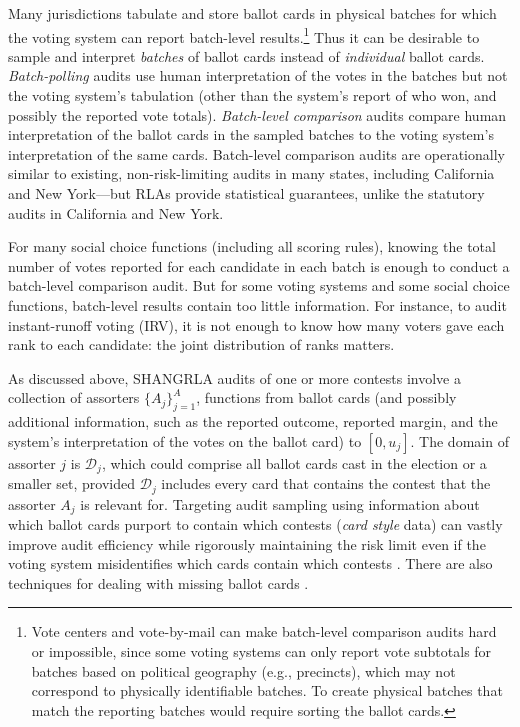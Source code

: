 \documentclass[12pt,runningheads]{llncs}
\newcommand{\cD}{\ensuremath{\mathcal{D}}}
\begin{document}
{Many jurisdictions tabulate and store ballot cards in physical batches for which the voting system
can report batch-level results.\footnote{%
Vote centers and vote-by-mail can make batch-level comparison audits hard or impossible,
since some voting systems can only report vote subtotals for batches based on political geography (e.g., precincts),
which may not correspond to physically identifiable batches.
To create physical batches that match the reporting batches would require sorting the ballot cards.
}
Thus it can be desirable to sample and interpret \emph{batches} of ballot cards instead of \emph{individual} ballot cards.
\emph{Batch-polling} audits use human interpretation of the votes in the batches but not the voting system's tabulation (other than the system's report of who won, and possibly the reported vote totals).
\emph{Batch-level comparison} audits compare human interpretation of the ballot cards in the sampled batches to the voting system's
interpretation of the same cards.
Batch-level comparison audits are operationally similar to existing, non-risk-limiting audits in many states,
including California and New York---but RLAs provide statistical guarantees, unlike the statutory audits in California and New York.

For many social choice functions (including all scoring rules), knowing the total number of votes
reported for each candidate in each batch is enough to conduct a batch-level comparison audit.
But for some voting systems and some social choice functions, batch-level results contain too little information.
For instance, to audit instant-runoff voting (IRV), it is not enough to know how many voters gave each rank to each candidate:
the joint distribution of ranks matters.

As discussed above, SHANGRLA audits of one or more contests involve a collection of assorters $\{A_j\}_{j=1}^A$,
functions from ballot cards (and possibly additional information, such as the reported outcome, reported margin,
and the system's interpretation of the votes on the ballot card) to $[0, u_j]$.
The domain of assorter $j$ is $\cD_j$, which could comprise all ballot cards cast in the election
or a smaller set, provided $\cD_j$ includes every card
that contains the contest that the assorter $A_j$ is relevant for.
Targeting audit sampling using information about which ballot cards purport to contain which contests (\emph{card style} data)
can vastly improve audit efficiency while rigorously maintaining the risk limit even if the voting system misidentifies which
cards contain which contests \cite{glazerEtal21}.
There are also techniques for dealing with missing ballot cards \cite{banuelosStark12,stark20}.

}
\end{document}
